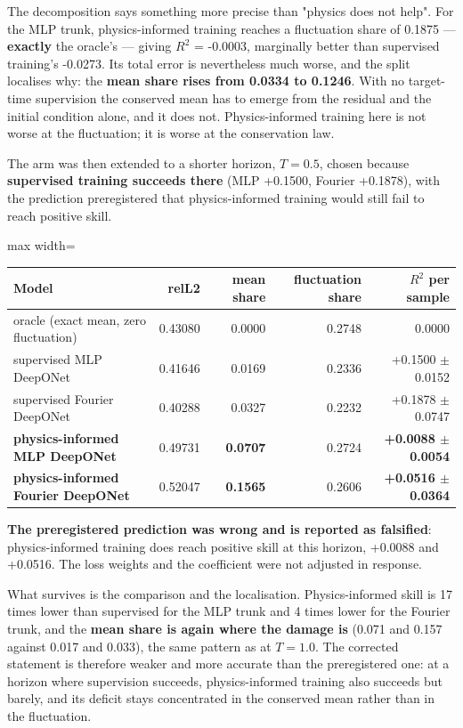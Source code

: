 \documentclass[preprint,12pt]{elsarticle}
\begin{document}
The decomposition says something more precise than "physics does not help". For the MLP trunk, physics-informed training reaches a fluctuation share of 0.1875 --- \textbf{exactly} the oracle's --- giving $R^2$ = -0.0003, marginally better than supervised training's -0.0273. Its total error is nevertheless much worse, and the split localises why: the \textbf{mean share rises from 0.0334 to 0.1246}. With no target-time supervision the conserved mean has to emerge from the residual and the initial condition alone, and it does not. Physics-informed training here is not worse at the fluctuation; it is worse at the conservation law.

The arm was then extended to a shorter horizon, $T = 0.5$, chosen because \textbf{supervised training succeeds there} (MLP +0.1500, Fourier +0.1878), with the prediction preregistered that physics-informed training would still fail to reach positive skill.

\begin{center}
\begin{adjustbox}{max width=\linewidth}
\small
\begin{tabular}{lrrrr}
\toprule
Model & relL2 & mean share & fluctuation share & \textbf{$R^2$ per sample} \\
\midrule
oracle (exact mean, zero fluctuation) & 0.43080 & 0.0000 & 0.2748 & 0.0000 \\
supervised MLP DeepONet & 0.41646 & 0.0169 & 0.2336 & +0.1500 $\pm$ 0.0152 \\
supervised Fourier DeepONet & 0.40288 & 0.0327 & 0.2232 & +0.1878 $\pm$ 0.0747 \\
\textbf{physics-informed MLP DeepONet} & 0.49731 & \textbf{0.0707} & 0.2724 & \textbf{+0.0088 $\pm$ 0.0054} \\
\textbf{physics-informed Fourier DeepONet} & 0.52047 & \textbf{0.1565} & 0.2606 & \textbf{+0.0516 $\pm$ 0.0364} \\
\bottomrule
\end{tabular}
\end{adjustbox}
\end{center}


\textbf{The preregistered prediction was wrong and is reported as falsified}: physics-informed training does reach positive skill at this horizon, +0.0088 and +0.0516. The loss weights and the coefficient were not adjusted in response.

What survives is the comparison and the localisation. Physics-informed skill is 17 times lower than supervised for the MLP trunk and 4 times lower for the Fourier trunk, and the \textbf{mean share is again where the damage is} (0.071 and 0.157 against 0.017 and 0.033), the same pattern as at $T = 1.0$. The corrected statement is therefore weaker and more accurate than the preregistered one: at a horizon where supervision succeeds, physics-informed training also succeeds but barely, and its deficit stays concentrated in the conserved mean rather than in the fluctuation.
\end{document}
